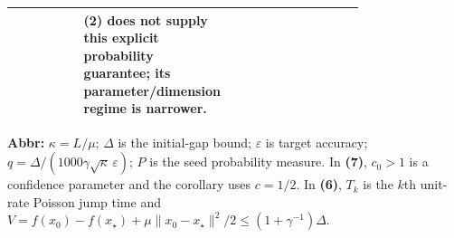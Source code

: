 \begin{table}[tp]
\begin{threeparttable}
\begin{tabularx}{\linewidth}{@{}>{\raggedright\arraybackslash}p{0.20\linewidth}>{\raggedright\arraybackslash}p{0.32\linewidth}>{\raggedright\arraybackslash}p{0.25\linewidth}>{\raggedright\arraybackslash}X@{}}
& \textbf{(2)} does not supply this explicit probability guarantee; its parameter/dimension regime is narrower. \\
\bottomrule
\end{tabularx}
\begin{tablenotes}[flushleft]\footnotesize
\item[] \textbf{Abbr:} $\kappa=L/\mu$; $\Delta$ is the initial-gap bound; $\varepsilon$ is target accuracy; $q=\Delta/(1000\gamma\sqrt\kappa\,\varepsilon)$; $P$ is the seed probability measure. In \textbf{(7)}, $c_0>1$ is a confidence parameter and the corollary uses $c=1/2$. In \textbf{(6)}, $T_k$ is the $k$th unit-rate Poisson jump time and $V=f(x_0)-f(x_\star)+\mu\|x_0-x_\star\|^2/2\le(1+\gamma^{-1})\Delta$.
\end{tablenotes}
\end{threeparttable}
\end{table}
\clearpage
